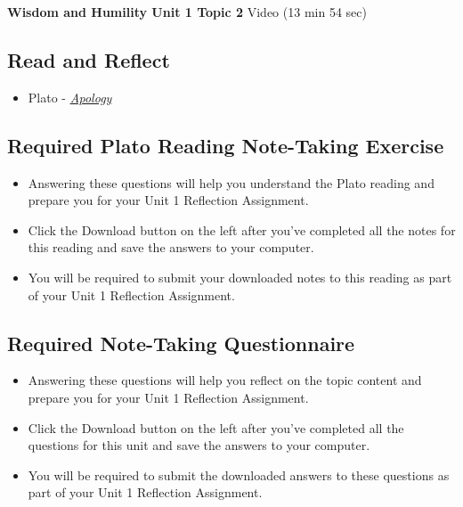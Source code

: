 \documentclass[
]{book}
\providecommand{\tightlist}{%
  \setlength{\itemsep}{0pt}\setlength{\parskip}{0pt}}
\begin{document}
\textbf{Wisdom and Humility Unit 1 Topic 2} Video (13 min 54 sec)

\hypertarget{read-and-reflect-1}{%
\subsection*{Read and Reflect}\label{read-and-reflect-1}}

\begin{itemize}
\tightlist
\item
  Plato - \href{https://classics.mit.edu/Plato/apology.html}{\emph{Apology}}
\end{itemize}

\hypertarget{required-plato-reading-note-taking-exercise}{%
\subsection*{Required Plato Reading Note-Taking Exercise}\label{required-plato-reading-note-taking-exercise}}

\begin{reflect}
\begin{itemize}
\tightlist
\item
  Answering these questions will help you understand the Plato reading and prepare you for your Unit 1 Reflection Assignment.
\item
  Click the Download button on the left after you've completed all the notes for this reading and save the answers to your computer.
\item
  You will be required to submit your downloaded notes to this reading as part of your Unit 1 Reflection Assignment.
\end{itemize}
\end{reflect}

\hypertarget{required-note-taking-questionnaire-1}{%
\subsection*{Required Note-Taking Questionnaire}\label{required-note-taking-questionnaire-1}}

\begin{reflect}
\begin{itemize}
\tightlist
\item
  Answering these questions will help you reflect on the topic content and prepare you for your Unit 1 Reflection Assignment.
\item
  Click the Download button on the left after you've completed all the questions for this unit and save the answers to your computer.
\item
  You will be required to submit the downloaded answers to these questions as part of your Unit 1 Reflection Assignment.
\end{itemize}
\end{reflect}
\end{document}
